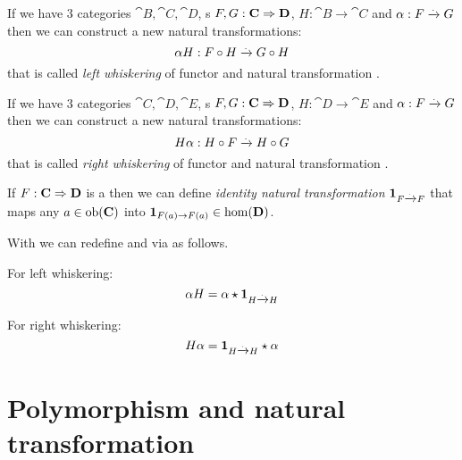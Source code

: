 
\begin{definition}
\label{def:lw}
If we have 3 categories $\cat{B}, \cat{C}, \cat{D}$, 
s $F,G: \mathbf{C} \Rightarrow \mathbf{D}$, $H: \cat{B} \to
\cat{C}$ and  
$\alpha: F \xrightarrow{.} G$ then we can construct a new natural
transformations:
\[
\alpha H : F \circ H \xrightarrow{.} G \circ H
\]
that is called \textit{left whiskering} of functor and natural
transformation \cite{nlab:whiskering}. 
\end{definition}

\begin{definition}
\label{def:rw}
If we have 3 categories $\cat{C}, \cat{D}, \cat{E}$, 
s $F,G: \mathbf{C} \Rightarrow \mathbf{D}$, $H: \cat{D} \to
\cat{E}$ and  
$\alpha: F \xrightarrow{.} G$ then we can construct a new natural 
transformations: 
\[
H \alpha : H \circ F \xrightarrow{.} H \circ G
\]
that is called \textit{right whiskering} of functor and natural
transformation \cite{nlab:whiskering}. 

\begin{definition}
\label{def:idnt}
If $F: \mathbf{C} \Rightarrow \mathbf{D}$ is a  then we can
define \textit{identity natural transformation}
$\mathbf{1}_{ F \xrightarrow{.} F }$ that maps any  
$a \in \mathrm{ob}(\mathbf{C})$ into  $\mathbf{1}_{ F(a) \to F(a) } \in \mathrm{hom}(\mathbf{D})$.
\end{definition}

\begin{remark}[Whiskering]
\label{rem:whiskering}
With  we can redefine  and
 via  as follows.

For left whiskering:
\begin{equation}
\label{eq:lw}
\alpha H = \alpha \star \mathbf{1}_{ H \xrightarrow{.} H }
\end{equation}

For right whiskering:
\begin{equation}
\label{eq:rw}
H \alpha = \mathbf{1}_{ H \xrightarrow{.} H } \star \alpha
\end{equation}
\end{remark}


\section{Polymorphism and natural transformation}


\end{definition}
